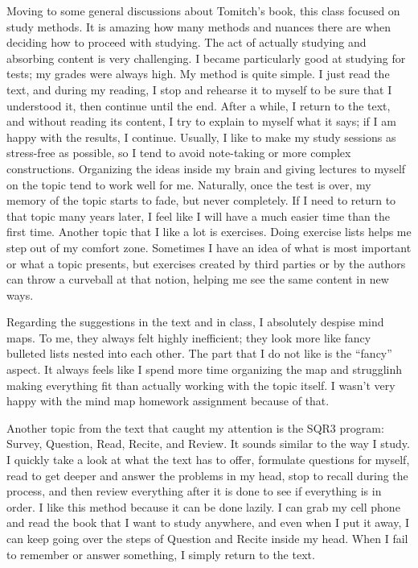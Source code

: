 Moving to some general discussions about Tomitch's book, this class focused on study methods. It is amazing how many methods and nuances there are when deciding how to proceed with studying. The act of actually studying and absorbing content is very challenging. I became particularly good at studying for tests; my grades were always high. My method is quite simple. I just read the text, and during my reading, I stop and rehearse it to myself to be sure that I understood it, then continue until the end. After a while, I return to the text, and without reading its content, I try to explain to myself what it says; if I am happy with the results, I continue. Usually, I like to make my study sessions as stress-free as possible, so I tend to avoid note-taking or more complex constructions. Organizing the ideas inside my brain and giving lectures to myself on the topic tend to work well for me. Naturally, once the test is over, my memory of the topic starts to fade, but never completely. If I need to return to that topic many years later, I feel like I will have a much easier time than the first time. Another topic that I like a lot is exercises. Doing exercise lists helps me step out of my comfort zone. Sometimes I have an idea of what is most important or what a topic presents, but exercises created by third parties or by the authors can throw a curveball at that notion, helping me see the same content in new ways.

Regarding the suggestions in the text and in class, I absolutely despise mind maps. To me, they always felt highly inefficient; they look more like fancy bulleted lists nested into each other. The part that I do not like is the ``fancy'' aspect. It always feels like I spend more time organizing the map and strugglinh making everything fit than actually working with the topic itself. I wasn't very happy with the mind map homework assignment because of that.

Another topic from the text that caught my attention is the SQR3 program: Survey, Question, Read, Recite, and Review. It sounds similar to the way I study. I quickly take a look at what the text has to offer, formulate questions for myself, read to get deeper and answer the problems in my head, stop to recall during the process, and then review everything after it is done to see if everything is in order. I like this method because it can be done lazily. I can grab my cell phone and read the book that I want to study anywhere, and even when I put it away, I can keep going over the steps of Question and Recite inside my head. When I fail to remember or answer something, I simply return to the text.


